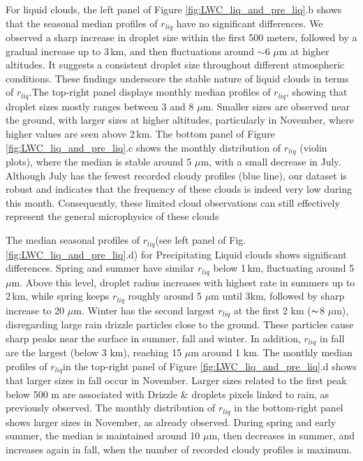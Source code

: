 For liquid clouds, the left panel of Figure \ref{fig:LWC_liq_and_pre_liq}.b shows that the seasonal median profiles of $r_{liq}$ have no significant differences. We observed a sharp increase in droplet size within the first 500 meters, followed by a gradual increase up to 3\,km, and then fluctuations around $\sim$6 $\mu$m at higher altitudes. It suggests a consistent droplet size throughout different atmospheric conditions. These findings underscore the stable nature of liquid clouds in terms of $r_{liq}$.The top-right panel displays monthly median profiles of $r_{liq}$, showing that droplet sizes mostly ranges between 3 and 8 $\mu$m. Smaller sizes are observed near the ground, with larger sizes at higher altitudes, particularly in November, where higher values are seen above 2\,km. The bottom panel of Figure \ref{fig:LWC_liq_and_pre_liq}.c shows the monthly distribution of $r_{liq}$ (violin plots), where the median is stable around 5 $\mu$m, with a small decrease in July. Although July has the fewest recorded cloudy profiles (blue line), our dataset is robust and indicates that the frequency of these clouds is indeed very low during this month. Consequently, these limited cloud observations can still effectively represent the general microphysics of these clouds


The median seasonal profiles of $r_{liq}$(see left panel of Fig. \ref{fig:LWC_liq_and_pre_liq}.d) for Precipitating Liquid clouds shows significant differences. Spring and summer have similar $r_{liq}$ below 1\,km, fluctuating around 5 $\mu$m. Above this level, droplet radius increases with highest rate in summers up to 2\,km, while spring keeps $r_{liq} $ roughly around 5 $\mu$m until 3km, followed by sharp increase to 20 $\mu$m. Winter has the second largest $r_{liq} $ at the first 2 km ($\thicksim$8 $\mu$m), disregarding large rain drizzle particles close to the ground. These particles cause sharp peaks near the surface in summer, fall and winter. In addition, $r_{liq} $ in fall are the largest (below 3 km), reaching 15 $\mu$m around 1 km. The monthly median profiles of $r_{liq}$in the top-right panel of Figure \ref{fig:LWC_liq_and_pre_liq}.d shows that larger sizes in fall occur in November. Larger sizes related to the first peak below 500 m are associated with Drizzle \& droplets pixels linked to rain, as previously observed. The monthly distribution of $r_{liq}$ in the bottom-right panel shows larger sizes in November, as already observed. During spring and early summer, the median is maintained around 10 $\mu$m, then decreases in summer, and increases again in fall, when the number of recorded cloudy profiles is maximum.

